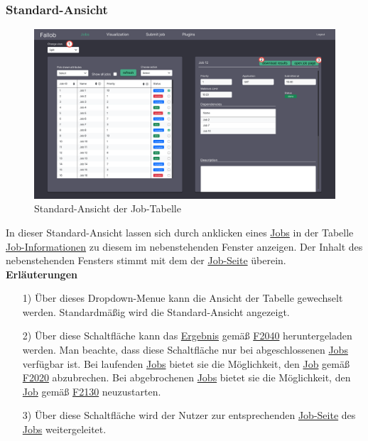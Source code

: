 \subsubsection{Standard-Ansicht}
\label{pages:job-table-default}
\begin{figure}[H]
    \centering
    \label{fig:job-table-default}
    \includegraphics[width=\textwidth]{images-interface/v6_interface/job_table_split_6.pdf}
    \caption{Standard-Ansicht der Job-Tabelle}
\end{figure}

In dieser Standard-Ansicht lassen sich durch anklicken eines \hyperref[B:Jobs]{Jobs} in der Tabelle \hyperref[B:Job-Informationen]{Job-Informationen} zu diesem im nebenstehenden Fenster anzeigen.
Der Inhalt des nebenstehenden Fensters stimmt mit dem der \hyperref[pages:job-page]{Job-Seite} überein.\\

\textbf{Erläuterungen}
\begin{itemize}
    \item[1)] Über dieses \gls{Dropdown-Menue} kann die Ansicht der Tabelle gewechselt werden. Standardmäßig wird die Standard-Ansicht angezeigt.
    \item[2)] Über diese Schaltfläche kann das \hyperref[B:Job-Ergebnis]{Ergebnis} gemäß \hyperref[FA:Web-Interface:Herunterladen eines einzelnen Ergebnisses]{F2040} heruntergeladen werden. Man beachte, dass diese Schaltfläche nur bei abgeschlossenen \hyperref[B:Jobs]{Jobs} verfügbar ist. Bei laufenden \hyperref[B:Jobs]{Jobs} bietet sie die Möglichkeit, den \hyperref[B:Jobs]{Job} gemäß \hyperref[FA:Web-Interface:Abbruch eines einzelnen Jobs]{F2020} abzubrechen. Bei abgebrochenen \hyperref[B:Jobs]{Jobs} bietet sie die Möglichkeit, den \hyperref[B:Jobs]{Job} gemäß \hyperref[FA:Web-Interface:Neustart]{F2130} neuzustarten.
   \item[3)] Über diese Schaltfläche wird der \gls{Nutzer} zur entsprechenden \hyperref[pages:job-page]{Job-Seite} des \hyperref[B:Jobs]{Jobs} weitergeleitet.
\end{itemize}

